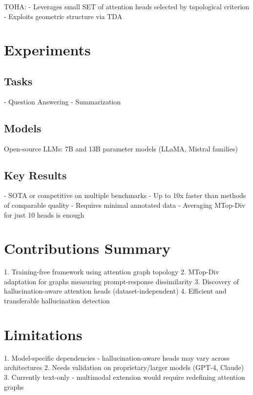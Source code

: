 TOHA:
- Leverages small SET of attention heads selected by topological criterion
- Exploits geometric structure via TDA

\section{Experiments}

\subsection{Tasks}
- Question Answering
- Summarization

\subsection{Models}
Open-source LLMs: 7B and 13B parameter models (LLaMA, Mistral families)

\subsection{Key Results}
- SOTA or competitive on multiple benchmarks
- Up to 10x faster than methods of comparable quality
- Requires minimal annotated data
- Averaging MTop-Div for just 10 heads is enough

\section{Contributions Summary}
1. Training-free framework using attention graph topology
2. MTop-Div adaptation for graphs measuring prompt-response dissimilarity
3. Discovery of hallucination-aware attention heads (dataset-independent)
4. Efficient and transferable hallucination detection

\section{Limitations}
1. Model-specific dependencies - hallucination-aware heads may vary across architectures
2. Needs validation on proprietary/larger models (GPT-4, Claude)
3. Currently text-only - multimodal extension would require redefining attention graphs
